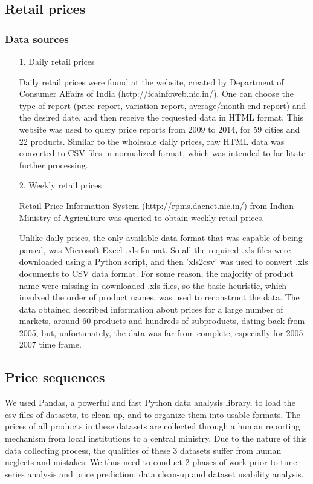 \subsection*{Retail prices}
\subsubsection*{Data sources}

\begin{itemize}

\item[1.] Daily retail prices

Daily retail prices were found at the website, created by Department of Consumer Affairs of India (http://fcainfoweb.nic.in/). One can choose the type of report (price report, variation report, average/month end report) and the desired date, and then receive the requested data in HTML format. This website was used to query price reports from 2009 to 2014, for 59 cities and 22 products. Similar to the wholesale daily prices, raw HTML data was converted to CSV files in normalized format, which was intended to facilitate further processing.

\item[2.] Weekly retail prices

Retail Price Information System (http://rpms.dacnet.nic.in/) from Indian Ministry of Agriculture was queried to obtain weekly retail prices.

Unlike daily prices, the only available data format that was capable of being parsed, was Microsoft Excel .xls format. So all the required .xls files were downloaded using a Python script, and then 'xls2csv' was used to convert .xls documents to CSV data format. For some reason, the majority of product name were missing in downloaded .xls files, so the basic heuristic, which involved the order of product names, was used to reconstruct the data.
The data obtained described information about prices for a large number of markets, around 60 products and hundreds of subproducts, dating back from 2005, but, unfortunately, the data was far from complete, especially for 2005-2007 time frame.

\end{itemize}

\subsection*{Price sequences}
We used Pandas, a powerful and fast Python data analysis library, to load the csv files of datasets, to clean up, and to organize them into usable formats. The prices of all products in these datasets are collected through a human reporting mechanism from local institutions to a central ministry. Due to the nature of this data collecting process, the qualities of these 3 datasets suffer from human neglects and mistakes. We thus need to conduct 2 phases of work prior to time series analysis and price prediction: data clean-up and dataset usability analysis.

